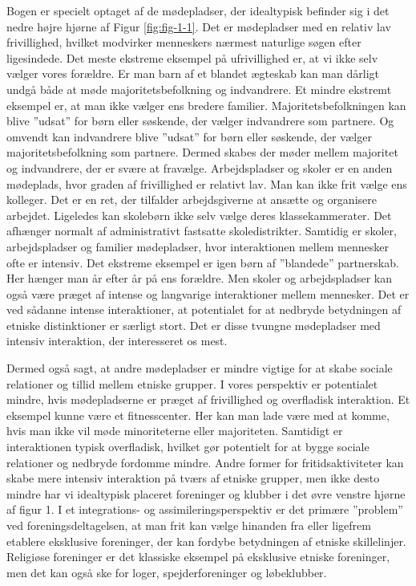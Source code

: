 \documentclass[
]{book}
\begin{document}
Bogen er specielt optaget af de mødepladser, der idealtypisk befinder sig i det nedre højre hjørne af Figur \ref{fig:fig-1-1}. Det er mødepladser med en relativ lav frivillighed, hvilket modvirker menneskers nærmest naturlige søgen efter ligesindede. Det meste ekstreme eksempel på ufrivillighed er, at vi ikke selv vælger vores forældre. Er man barn af et blandet ægteskab kan man dårligt undgå både at møde majoritetsbefolkning og indvandrere. Et mindre ekstremt eksempel er, at man ikke vælger ens bredere familier. Majoritetsbefolkningen kan blive ''udsat'' for børn eller søskende, der vælger indvandrere som partnere. Og omvendt kan indvandrere blive ''udsat'' for børn eller søskende, der vælger majoritetsbefolkning som partnere. Dermed skabes der møder mellem majoritet og indvandrere, der er svære at fravælge. Arbejdspladser og skoler er en anden mødeplads, hvor graden af frivillighed er relativt lav. Man kan ikke frit vælge ens kolleger. Det er en ret, der tilfalder arbejdsgiverne at ansætte og organisere arbejdet. Ligeledes kan skolebørn ikke selv vælge deres klassekammerater. Det afhænger normalt af administrativt fastsatte skoledistrikter. Samtidig er skoler, arbejdspladser og familier mødepladser, hvor interaktionen mellem mennesker ofte er intensiv. Det ekstreme eksempel er igen børn af ''blandede'' partnerskab. Her hænger man år efter år på ens forældre. Men skoler og arbejdspladser kan også være præget af intense og langvarige interaktioner mellem mennesker. Det er ved sådanne intense interaktioner, at potentialet for at nedbryde betydningen af etniske distinktioner er særligt stort. Det er disse tvungne mødepladser med intensiv interaktion, der interesseret os mest.

Dermed også sagt, at andre mødepladser er mindre vigtige for at skabe sociale relationer og tillid mellem etniske grupper. I vores perspektiv er potentialet mindre, hvis mødepladserne er præget af frivillighed og overfladisk interaktion. Et eksempel kunne være et fitnesscenter. Her kan man lade være med at komme, hvis man ikke vil møde minoriteterne eller majoriteten. Samtidigt er interaktionen typisk overfladisk, hvilket gør potentielt for at bygge sociale relationer og nedbryde fordomme mindre. Andre former for fritidsaktiviteter kan skabe mere intensiv interaktion på tværs af etniske grupper, men ikke desto mindre har vi idealtypisk placeret foreninger og klubber i det øvre venstre hjørne af figur 1. I et integrations- og assimileringsperspektiv er det primære ''problem'' ved foreningsdeltagelsen, at man frit kan vælge hinanden fra eller ligefrem etablere eksklusive foreninger, der kan fordybe betydningen af etniske skillelinjer. Religiøse foreninger er det klassiske eksempel på eksklusive etniske foreninger, men det kan også ske for loger, spejderforeninger og løbeklubber.
\end{document}
